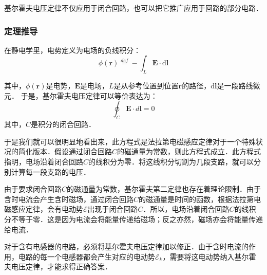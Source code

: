 基尔霍夫电压定律不仅应用于闭合回路，也可以把它推广应用于回路的部分电路．

\subsubsection{定理推导}
在静电学里，电势定义为电场的负线积分：
\begin{equation}
\phi(\mathbf{r})\stackrel{def}{=} - \int_{L} \mathbf{E} \cdot \mathrm{d} \mathbf{l}
\end{equation}

其中，$\phi(\mathbf{r})$是电势，$\mathbf{E}$是电场，${L}$是从参考位置到位置$\mathbf{r}$的路径，$\mathrm{d} \mathbf{l}$是一段路线微元．
于是，基尔霍夫电压定律可以等价表达为：
\begin{equation}
\oint _{{C} }\mathbf {E} \cdot d\mathbf {l} =0
\end{equation}
其中，${C}$是积分的闭合回路．

于是我们就可以很明显地看出来，此方程式是法拉第电磁感应定律对于一个特殊状况的简化版本．假设通过闭合回路${C}$的磁通量为常数，则此方程式成立．此方程式指明，电场沿着闭合回路${C}$的线积分为零．将这线积分切割为几段支路，就可以分别计算每一段支路的电压．

由于要求闭合回路${C}$的磁通量为常数，基尔霍夫第二定律也存在着理论限制．由于含时电流会产生含时磁场，通过闭合回路${C}$的磁通量是时间的函数，根据法拉第电磁感应定律，会有电动势$\mathcal{E}$出现于闭合回路${C}$．所以，电场沿着闭合回路${C}$的线积分不等于零．这是因为电流会将能量传递给磁场；反之亦然，磁场亦会将能量传递给电流．

对于含有电感器的电路，必须将基尔霍夫电压定律加以修正．由于含时电流的作用，电路的每一个电感器都会产生对应的电动势$\mathcal{E}_k$，需要将这电动势纳入基尔霍夫电压定律，才能求得正确答案．